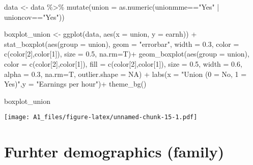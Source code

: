 \documentclass[
]{article}
\newenvironment{Shaded}{\begin{snugshade}}{\end{snugshade}}
\newcommand{\AttributeTok}[1]{\textcolor[rgb]{0.77,0.63,0.00}{#1}}
\newcommand{\ConstantTok}[1]{\textcolor[rgb]{0.00,0.00,0.00}{#1}}
\newcommand{\DecValTok}[1]{\textcolor[rgb]{0.00,0.00,0.81}{#1}}
\newcommand{\FloatTok}[1]{\textcolor[rgb]{0.00,0.00,0.81}{#1}}
\newcommand{\FunctionTok}[1]{\textcolor[rgb]{0.00,0.00,0.00}{#1}}
\newcommand{\NormalTok}[1]{#1}
\newcommand{\OtherTok}[1]{\textcolor[rgb]{0.56,0.35,0.01}{#1}}
\newcommand{\SpecialCharTok}[1]{\textcolor[rgb]{0.00,0.00,0.00}{#1}}
\newcommand{\StringTok}[1]{\textcolor[rgb]{0.31,0.60,0.02}{#1}}
\begin{document}
\begin{Shaded}
\begin{Highlighting}[]
\NormalTok{data }\OtherTok{\textless{}{-}}\NormalTok{ data }\SpecialCharTok{\%\textgreater{}\%} \FunctionTok{mutate}\NormalTok{(}\AttributeTok{union =} \FunctionTok{as.numeric}\NormalTok{(unionmme}\SpecialCharTok{==}\StringTok{"Yes"} \SpecialCharTok{|}\NormalTok{ unioncov}\SpecialCharTok{==}\StringTok{"Yes"}\NormalTok{))}

\NormalTok{boxplot\_union }\OtherTok{\textless{}{-}} \FunctionTok{ggplot}\NormalTok{(data, }\FunctionTok{aes}\NormalTok{(}\AttributeTok{x =}\NormalTok{ union, }\AttributeTok{y =}\NormalTok{ earnh)) }\SpecialCharTok{+}
  \FunctionTok{stat\_boxplot}\NormalTok{(}\FunctionTok{aes}\NormalTok{(}\AttributeTok{group =}\NormalTok{ union), }\AttributeTok{geom =} \StringTok{"errorbar"}\NormalTok{, }\AttributeTok{width =} \FloatTok{0.3}\NormalTok{,}
               \AttributeTok{color =} \FunctionTok{c}\NormalTok{(color[}\DecValTok{2}\NormalTok{],color[}\DecValTok{1}\NormalTok{]), }\AttributeTok{size =} \FloatTok{0.5}\NormalTok{, }\AttributeTok{na.rm=}\NormalTok{T)}\SpecialCharTok{+}
  \FunctionTok{geom\_boxplot}\NormalTok{(}\FunctionTok{aes}\NormalTok{(}\AttributeTok{group =}\NormalTok{ union),}
               \AttributeTok{color =} \FunctionTok{c}\NormalTok{(color[}\DecValTok{2}\NormalTok{],color[}\DecValTok{1}\NormalTok{]), }\AttributeTok{fill =} \FunctionTok{c}\NormalTok{(color[}\DecValTok{2}\NormalTok{],color[}\DecValTok{1}\NormalTok{]),}
               \AttributeTok{size =} \FloatTok{0.5}\NormalTok{, }\AttributeTok{width =} \FloatTok{0.6}\NormalTok{, }\AttributeTok{alpha =} \FloatTok{0.3}\NormalTok{, }\AttributeTok{na.rm=}\NormalTok{T, }\AttributeTok{outlier.shape =} \ConstantTok{NA}\NormalTok{) }\SpecialCharTok{+}
  \FunctionTok{labs}\NormalTok{(}\AttributeTok{x =} \StringTok{"Union (0 = No, 1 = Yes)"}\NormalTok{,}\AttributeTok{y =} \StringTok{"Earnings per hour"}\NormalTok{)}\SpecialCharTok{+}
  \FunctionTok{theme\_bg}\NormalTok{()}

\NormalTok{boxplot\_union}
\end{Highlighting}
\end{Shaded}

\texttt{[image: A1\_files/figure-latex/unnamed-chunk-15-1.pdf]}

\hypertarget{furhter-demographics-family}{%
\section{Furhter demographics
(family)}\label{furhter-demographics-family}}
\end{document}
